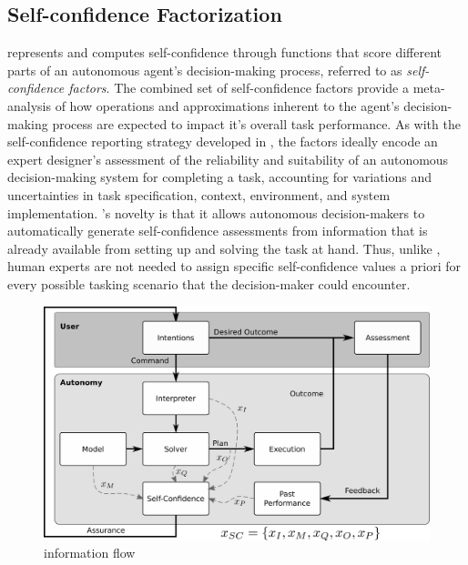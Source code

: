 \subsection{Self-confidence Factorization} \label{sec:self-confidence}

\famsec{} represents and computes self-confidence through functions that score different parts of an autonomous agent's decision-making process, referred to as \emph{self-confidence factors}. The combined set of self-confidence factors provide a meta-analysis of how operations and approximations inherent to the agent's decision-making process are expected to impact it's overall task performance. 
As with the self-confidence reporting strategy developed in \cite{Hutchins2015-if}, the factors ideally encode an expert designer's assessment of the reliability and suitability of an autonomous decision-making system for completing a task, accounting for variations and uncertainties in task specification, context, environment, and system implementation. \famsec{}'s novelty is that it allows autonomous decision-makers to automatically generate self-confidence assessments from information that is already available from setting up and solving the task at hand. Thus, unlike \cite{Hutchins2015-if}, human experts are not needed to assign specific self-confidence values a priori for every possible tasking scenario that the decision-maker could encounter. %
    
    
\begin{figure}[tbp]
        \centering
        \includegraphics[width=0.9\linewidth]{Figures/FaMSeC.png}
        \caption{\famsec{} information flow}
        \label{fig:famsec}
        \vspace{-0.5 cm}
\end{figure}
    
